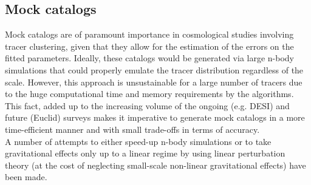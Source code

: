 \documentclass[fleqn, usenatbib]{mnras}
\begin{document}
\subsection{Mock catalogs}
Mock catalogs are of paramount importance in cosmological studies involving tracer clustering, given that they allow for the estimation of the errors on the fitted parameters. Ideally, these catalogs would be generated via large n-body simulations that could properly emulate the tracer distribution regardless of the scale. However, this approach is unsustainable for a large number of tracers due to the huge computational time and memory requirements by the algorithms. This fact, added up to the increasing volume of the ongoing (e.g. DESI) and future (Euclid) surveys makes it imperative to generate mock catalogs in a more time-efficient manner and with small trade-offs in terms of accuracy.\\
A number of attempts to either speed-up n-body simulations \citep[e.g.][]{Tassev2013} or to take gravitational effects only up to a linear regime by using linear perturbation theory (at the cost of neglecting small-scale non-linear gravitational effects) have been made.\\
\end{document}
